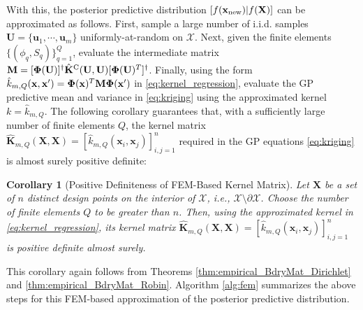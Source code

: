 \documentclass[aos,preprint]{imsart}
\theoremstyle{plain}
\newcommand{\CalX}{\mathcal X}
\newcommand{\BFX}{\bold X}
\newcommand{\BFx}{\bold x}
\newcommand{\BU}{\bold U}
\newcommand{\BK}{\bold K}
\newcommand{\BPhi}{\boldsymbol{\Phi}}
\newtheorem{corollary}{Corollary}
\theoremstyle{remark}
\begin{document}
With this, the posterior predictive distribution $[f(\mathbf{x}_{\rm new})|f(\mathbf{X})]$ can be approximated as follows. First, sample a large number of i.i.d. samples $\mathbf{U} = \{\mathbf{u}_1, \cdots, \mathbf{u}_m\}$ uniformly-at-random on $\mathcal{X}$. Next, given the finite elements \(\{(\phi_q, S_q)\}_{q=1}^Q\), evaluate the intermediate matrix $\mathbf{M} = [\BPhi(\BU)]^\dagger \hat{\BK}^{\rm C}(\BU, \BU) [\BPhi(\BU)^T]^\dagger$. Finally, using the form $\hat{k}_{m,Q}(\mathbf{x},\mathbf{x}') = \BPhi(\BFx)^T \mathbf{M} \BPhi(\BFx')$ in \eqref{eq:kernel_regression}, evaluate the GP predictive mean and variance in \eqref{eq:kriging} using the approximated kernel $k = \hat{k}_{m,Q}$. The following corollary guarantees that, with a sufficiently large number of finite elements $Q$, the kernel matrix $\hat{\mathbf{K}}_{m,Q}(\mathbf{X},\mathbf{X}) = [\hat{k}_{m,Q}(\mathbf{x}_i,\mathbf{x}_j)]_{i,j=1}^n$ required in the GP equations \eqref{eq:kriging} is almost surely positive definite:
\begin{corollary}[Positive Definiteness of FEM-Based Kernel Matrix]
Let $\mathbf{X}$ be a set of $n$ distinct design points on the interior of $\mathcal{X}$, i.e., $\CalX \setminus \partial \CalX$. Choose the number of finite elements $Q$ to be greater than $n$. Then, using the approximated kernel in \eqref{eq:kernel_regression}, its kernel matrix $\hat{\mathbf{K}}_{m,Q}(\mathbf{X},\mathbf{X}) = [\hat{k}_{m,Q}(\mathbf{x}_i,\mathbf{x}_j)]_{i,j=1}^n$ is positive definite almost surely. 
\label{coro:pd}
\end{corollary}
\noindent This corollary again follows from Theorems \ref{thm:empirical_BdryMat_Dirichlet} and \ref{thm:empirical_BdryMat_Robin}. Algorithm \ref{alg:fem} summarizes the above steps for this FEM-based approximation of the posterior predictive distribution.
\end{document}
